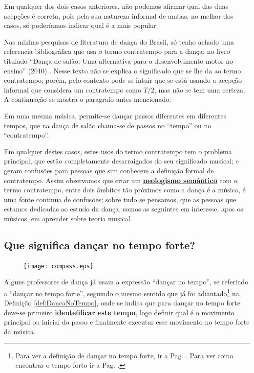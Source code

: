 Em qualquer dos dois casos anteriores, não podemos afirmar qual das duas acepções é correta,
pois pela sua natureza informal de ambas,
no melhor dos casos, só poderíamos indicar qual é a mais popular.

Nas minhas pesquisas de literatura de dança do Brasil, 
só tenho achado uma referencia bibliográfica que usa o termo contratempo para a dança;
no livro titulado ``Dança de salão: Uma alternativa para o desenvolvimento motor no ensino'' 
(2010) \cite{maia2010danca}.
Nesse texto não se explica o significado que se lhe da ao termo contratempo;
porém, pelo contexto pode-se intuir que se está usando a acepção informal 
que considera um contratempo como $T/2$, mas não se tem uma certeza.
A continuação se mostra o paragrafo antes mencionado:
\begin{citando}
Em uma mesma música, permite-se dançar passos diferentes em diferentes tempos,
que na dança de salão chama-se de passos no ``tempo'' ou no ``contratempo''.
\end{citando}


Em qualquer destes casos, 
estes usos do termo contratempo tem o problema principal, 
que estão completamente desarraigados do seu significado musical;
e geram confusões para pessoas que sim conhecem a definição formal de contratempo.
Assim observamos que criar um 
\hyperref[def:NeologismoSemantico]{\textbf{neologismo semântico}} com o termo contratempo, 
entre dois âmbitos tão próximos como a dança é a música, é uma fonte continua de confusões;
sobre tudo se pensamos, que as pessoas que estamos dedicadas ao estudo da dança,
somos as seguintes em interesse, apos os músicos, em aprender sobre teoria musical.


\subsection{Que significa dançar no tempo forte?}
\label{subsec:dancatempoforte}

\begin{figure}
  \vspace{-10pt}
  \centering
    \texttt{[image: compass.eps]}
  \vspace{-10pt}
\end{figure}
Alguns professores de dança já usam a expressão ``dançar no tempo'', 
se referindo a ``dançar no tempo forte'', seguindo o mesmo sentido que já foi adiantado\footnote{Para 
ver a definição de dançar no tempo forte, ir a Pag. \pageref{def:DancaNoTempo}.
Para ver como encontrar o tempo forto ir a Pag. \pageref{subsec:perceberTF1}.}
 na Definição \ref{def:DancaNoTempo},
onde se indica que para dançar no tempo forte deve-se primeiro 
\hyperref[subsec:perceberTF1]{\textbf{identefificar este tempo}}, logo definir
 qual é o movimento principal ou inicial do passo
e finalmente executar esse movimento no tempo forte da música.

